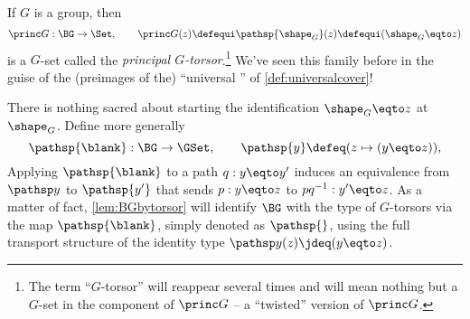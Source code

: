 \begin{example}\label{def:principaltorsor}
  If $G$ is a group, then
  \[
    \princ G:\BG\to\Set,
    \qquad\princ G(z)\defequi\pathsp{\shape_G}(z)\defequi(\shape_G \eqto z)
  \]
  is a $G$-set called the \emph{principal $G$-torsor}.\footnote{%
    The term ``$G$-torsor'' will reappear several times and will mean nothing but a $G$-set in the component of $\princ G$ -- a ``twisted'' version of $\princ G$.}
  We've seen this family before in the guise of the (preimages of the) ``universal \covering'' of \cref{def:universalcover}!

  There is nothing sacred about starting the identification
  $\shape_G \eqto z$ at $\shape_G$.
  Define more generally
  \begin{equation}\label{eq:pathsp}
    \pathsp{\blank}:\BG\to\GSet,
    \qquad
    \pathsp{y} \defeq (z \mapsto (y\eqto z)),
  \end{equation}
  Applying $\pathsp{\blank}$ to a path $q:y\eqto y'$
  induces an equivalence from $\pathsp y$ to $\pathsp {y'}$ that sends $p:y \eqto z$
  to $pq^{-1}:y'\eqto z$.
  As a matter of fact, \cref{lem:BGbytorsor} will identify $\BG$ with the type of
  $G$-torsors via the map $\pathsp{\blank}$, simply denoted as $\pathsp{}$,
  using the full transport structure of the identity type $\pathsp y(z)\jdeq(y \eqto z)$.
\end{example}

